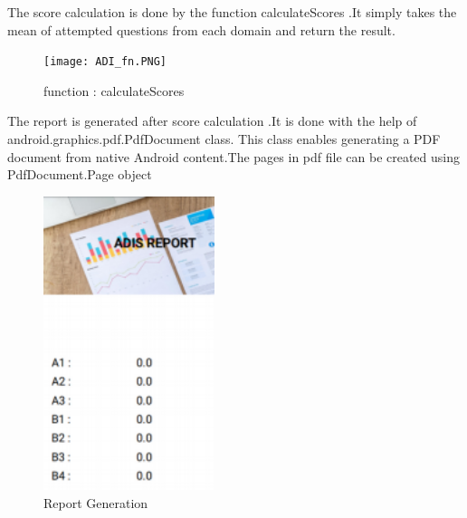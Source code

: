 The score calculation is done by the function calculateScores .It simply takes the mean of attempted questions from each domain and return the result.
\begin{figure}[h]
\label{ss}
\centering
\texttt{[image: ADI\_fn.PNG]}
\caption{function : calculateScores}
\end{figure}
The report is generated after score calculation .It is done with the help of 	android.graphics.pdf.PdfDocument class. This class enables generating a PDF document from native Android content.The pages in pdf file can be created using PdfDocument.Page object
\begin{figure}[h]
\label{ss}
\centering
\includegraphics[width=5cm]{ADI_report.PNG}
\caption{Report Generation}
\end{figure}


























































